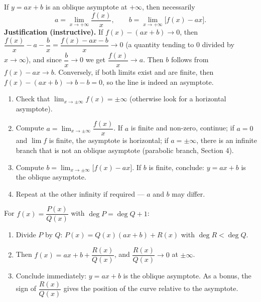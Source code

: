\documentclass[11pt]{article}
\begin{document}
\begin{propriete}
If $y=ax+b$ is an oblique asymptote at $+\infty$, then necessarily
\[ a=\lim_{x\to +\infty}\frac{f(x)}{x}, \qquad b=\lim_{x\to +\infty}\bigl[f(x)-ax\bigr]. \]
\textbf{Justification (instructive).} If $f(x)-(ax+b)\to 0$, then $\dfrac{f(x)}{x}-a-\dfrac{b}{x}=\dfrac{f(x)-ax-b}{x}\to 0$ (a quantity tending to $0$ divided by $x\to\infty$), and since $\dfrac{b}{x}\to 0$ we get $\dfrac{f(x)}{x}\to a$. Then $b$ follows from $f(x)-ax\to b$. Conversely, if both limits exist and are finite, then $f(x)-(ax+b)\to b-b=0$, so the line is indeed an asymptote.
\end{propriete}

\begin{methode}
\begin{enumerate}
\item Check that $\lim_{x\to\pm\infty}f(x)=\pm\infty$ (otherwise look for a horizontal asymptote).
\item Compute $a=\lim_{x\to\pm\infty}\dfrac{f(x)}{x}$. If $a$ is finite and non-zero, continue; if $a=0$ and $\lim f$ is finite, the asymptote is horizontal; if $a=\pm\infty$, there is an infinite branch that is not an oblique asymptote (parabolic branch, Section 4).
\item Compute $b=\lim_{x\to\pm\infty}\bigl[f(x)-ax\bigr]$. If $b$ is finite, conclude: $y=ax+b$ is the oblique asymptote.
\item Repeat at the other infinity if required — $a$ and $b$ may differ.
\end{enumerate}
\end{methode}

\begin{methode}
For $f(x)=\dfrac{P(x)}{Q(x)}$ with $\deg P=\deg Q +1$:
\begin{enumerate}
\item Divide $P$ by $Q$: $P(x)=Q(x)(ax+b)+R(x)$ with $\deg R<\deg Q$.
\item Then $f(x)=ax+b+\dfrac{R(x)}{Q(x)}$, and $\dfrac{R(x)}{Q(x)}\to 0$ at $\pm\infty$.
\item Conclude immediately: $y=ax+b$ is the oblique asymptote. As a bonus, the sign of $\dfrac{R(x)}{Q(x)}$ gives the position of the curve relative to the asymptote.
\end{enumerate}
\end{methode}
\end{document}
